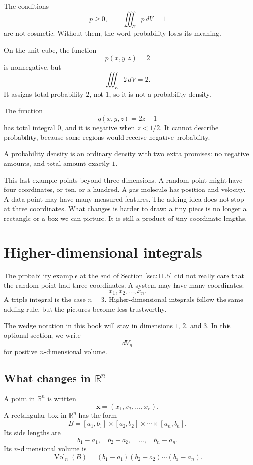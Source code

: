 The conditions
\[
    p\ge0,
    \qquad
    \iiint_E p\,dV=1
\]
are not cosmetic.  Without them, the word probability loses its meaning.

\begin{example}
On the unit cube, the function
\[
    p(x,y,z)=2
\]
is nonnegative, but
\[
    \iiint_E 2\,dV=2.
\]
It assigns total probability \(2\), not \(1\), so it is not a probability density.

The function
\[
    q(x,y,z)=2z-1
\]
has total integral \(0\), and it is negative when \(z<1/2\).  It cannot describe
probability, because some regions would receive negative probability.

A probability density is an ordinary density with two extra promises: no negative
amounts, and total amount exactly \(1\).
\end{example}

This last example points beyond three dimensions.  A random point might have four
coordinates, or ten, or a hundred.  A gas molecule has position and velocity.  A data
point may have many measured features.  The adding idea does not stop at three
coordinates.  What changes is harder to draw: a tiny piece is no longer a rectangle or a
box we can picture.  It is still a product of tiny coordinate lengths.

\section{Higher-dimensional integrals}
\label{sec:11.6}

The probability example at the end of Section \ref{sec:11.5} did not really care that the
random point had three coordinates.  A system may have many coordinates:
\[
    x_1,x_2,\ldots,x_n.
\]
A triple integral is the case \(n=3\).  Higher-dimensional integrals follow the same
adding rule, but the pictures become less trustworthy.

The wedge notation in this book will stay in dimensions \(1\), \(2\), and \(3\).  In this
optional section, we write
\[
    dV_n
\]
for positive \(n\)-dimensional volume.

\subsection{What changes in \texorpdfstring{\(\mathbb R^n\)}{Rn}}

A point in \(\mathbb R^n\) is written
\[
    \mathbf x=(x_1,x_2,\ldots,x_n).
\]
A rectangular box in \(\mathbb R^n\) has the form
\[
    B=[a_1,b_1]\times[a_2,b_2]\times\cdots\times[a_n,b_n].
\]
Its side lengths are
\[
    b_1-a_1,\quad b_2-a_2,\quad \ldots,\quad b_n-a_n.
\]
Its \(n\)-dimensional volume is
\[
\boxed{
    \operatorname{Vol}_n(B)
    =
    (b_1-a_1)(b_2-a_2)\cdots(b_n-a_n).
}
\]

